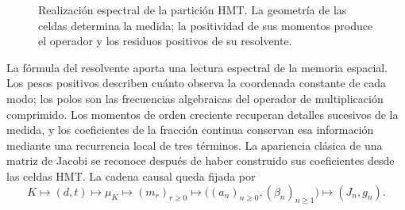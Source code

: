 \begin{figure}[htbp]
\centering
{}
\caption{Realización espectral de la partición HMT. La geometría de las
celdas determina la medida; la positividad de sus momentos produce el
operador y los residuos positivos de su resolvente.}
\label{fig:jacobi-generated}
\end{figure}

La fórmula del resolvente aporta una lectura espectral de la memoria
espacial. Los pesos positivos describen cuánto observa la coordenada
constante de cada modo; los polos son las frecuencias algebraicas del
operador de multiplicación comprimido. Los momentos de orden creciente
recuperan detalles sucesivos de la medida, y los coeficientes de la
fracción continua conservan esa información mediante una recurrencia
local de tres términos. La apariencia clásica de una matriz de Jacobi
se reconoce después de haber construido sus coeficientes desde las
celdas HMT. La cadena causal queda fijada por
\[
 K\longmapsto(d,t)\longmapsto\mu_K\longmapsto(m_r)_{r\geq0}
 \longmapsto\bigl((a_n)_{n\geq0},(\beta_n)_{n\geq1}\bigr)
 \longmapsto(J_n,g_n).
\]

